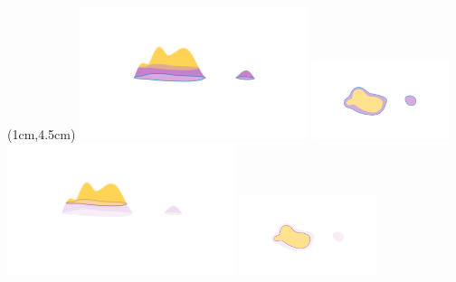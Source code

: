 \begin{frame}
  \begin{textblock*}{11cm}(1cm,4.5cm)
    \includegraphics[trim=200 300 200 200, clip, width=0.5\textwidth]{../scripts/figures/surf/ass1_C_side.png}
    \includegraphics[trim=300 150 200 200, clip, width=0.3\textwidth]{../scripts/figures/surf/ass1_C_top.png}
    \includegraphics[trim=200 300 200 200, clip, width=0.5\textwidth]{../scripts/figures/surf/ass1_D_side.png}
    \includegraphics[trim=300 150 200 200, clip, width=0.3\textwidth]{../scripts/figures/surf/ass1_D_top.png}
  \end{textblock*}
\end{frame}

